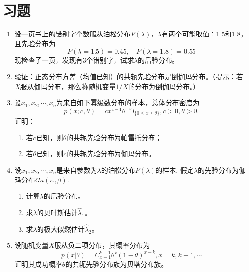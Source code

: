 \section{习题}
\begin{enumerate}
\item 设一页书上的错别字个数服从泊松分布$P(\lambda)$，$\lambda$有两个可能取值：1.5和1.8，且先验分布为
$$
P(\lambda = 1.5) = 0.45, \quad P(\lambda = 1.8) = 0.55
$$
现检查了一页，发现有$3$个错别字，试求$\lambda$的后验分布。

\item 验证：正态分布方差（均值已知）的共轭先验分布是倒伽玛分布。（提示：若$X$服从伽玛分布，那么称随机变量$1/X$的分布为倒伽玛分布。）

\item 设$x_1,x_2,\cdots,x_n$为来自如下幂级数分布的样本，总体分布密度为
$$
p(x;c,\theta) = cx^{c-1}\theta^{-c} I_{\{ 0\leq x \leq \theta \}}, c> 0, \theta >0.
$$
证明：
\begin{enumerate}
    \item 若$c$已知，则$\theta$的共轭先验分布为帕雷托分布；
\item 若$\theta$已知，则$c$的共轭先验分布为伽玛分布。
\end{enumerate}

\item  设$x_1,x_2,\cdots,x_n$是来自参数为$\lambda$的泊松分布$P(\lambda)$的样本. 假定$\lambda$的先验分布为伽玛分布$Ga(\alpha,\beta)$.
\begin{enumerate}
    \item 计算$\lambda$的后验分布。
\item 求$\lambda$的贝叶斯估计$\hat{\lambda}_1$。
\item 求$\lambda$的极大似然估计$\hat{\lambda}_2$。
\end{enumerate}


\item 设随机变量$X$服从负二项分布，其概率分布为
$$
p(x|\theta)  =  C_{x-1}^{k-1}\theta^k (1-\theta)^{x-k}, x= k,k+1,\cdots
$$
证明其成功概率$\theta$的共轭先验分布族为贝塔分布族。
\end{enumerate}